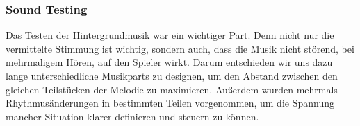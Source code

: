 \subsubsection{Sound Testing}\label{subsubsec:Sound-Testing}
Das Testen der Hintergrundmusik war ein wichtiger Part. Denn nicht nur die vermittelte Stimmung ist wichtig, sondern auch, dass die Musik nicht störend, bei mehrmaligem Hören, auf den Spieler wirkt.
Darum entschieden wir uns dazu lange unterschiedliche Musikparts zu designen, um den Abstand zwischen den gleichen Teilstücken der Melodie zu maximieren.
Außerdem wurden mehrmals Rhythmusänderungen in bestimmten Teilen vorgenommen, um die Spannung mancher Situation klarer definieren und steuern zu können.

%

\renewcommand{\kapitelautor}{}
